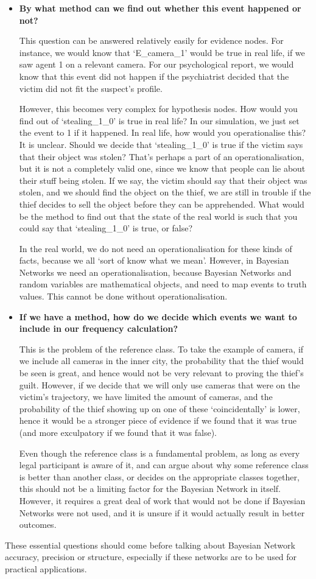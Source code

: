 \begin{itemize}
\item \textbf{By what method can we find out whether this event happened or not?}

This question can be answered relatively easily for evidence nodes. For instance, we would know that `E\_camera\_1' would be true in real life, if we saw agent 1 on a relevant camera. For our psychological report, we would know that this event did not happen if the psychiatrist decided that the victim did not fit the suspect's profile.

However, this becomes very complex for hypothesis nodes. How would you find out of `stealing\_1\_0' is true in real life? In our simulation, we just set the event to 1 if it happened. In real life, how would you operationalise this? It is unclear. Should we decide that `stealing\_1\_0' is true if the victim says that their object was stolen? That's perhaps a part of an operationalisation, but it is not a completely valid one, since we know that people can lie about their stuff being stolen. If we say, the victim should say that their object was stolen, and we should find the object on the thief, we are still in trouble if the thief decides to sell the object before they can be apprehended. What would be the method to find out that the state of the real world is such that you could say that `stealing\_1\_0' is true, or false?

 In the real world, we do not need an operationalisation for these kinds of facts, because we all `sort of know what we mean'. However, in Bayesian Networks we need an operationalisation, because Bayesian Networks and random variables are mathematical objects, and need to map events to truth values. This cannot be done without operationalisation.

\item \textbf{If we have a method, how do we decide which events we want to include in our frequency calculation?}

This is the problem of the reference class. To take the example of camera, if we include all cameras in the inner city, the probability that the thief would be seen is great, and hence would not be very relevant to proving the thief's guilt. However, if we decide that we will only use cameras that were on the victim's trajectory, we have limited the amount of cameras, and the probability of the thief showing up on one of these `coincidentally' is lower, hence it would be a stronger piece of evidence if we found that it was true (and more exculpatory if we found that it was false). 

Even though the reference class is a fundamental problem, as long as every legal participant is aware of it, and can argue about why some reference class is better than another class, or decides on the appropriate classes together, this should not be a limiting factor for the Bayesian Network in itself. However, it requires a great deal of work that would not be done if Bayesian Networks were not used, and it is unsure if it would actually result in better outcomes.

\end{itemize}

These essential questions should come before talking about Bayesian Network accuracy, precision or structure, especially if these networks are to be used for practical applications.



